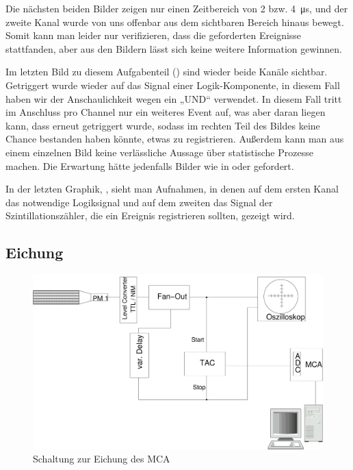 Die nächsten beiden Bilder zeigen nur einen Zeitbereich von 2 bzw.
\SI{4}{\micro\second}, und der zweite Kanal wurde von uns offenbar aus dem
sichtbaren Bereich hinaus bewegt. Somit kann man leider nur verifizieren, dass
die geforderten Ereignisse stattfanden, aber aus den Bildern lässt sich keine
weitere Information gewinnen. 

Im letzten Bild zu diesem Aufgabenteil () sind wieder beide
Kanäle sichtbar. Getriggert wurde wieder auf das Signal einer Logik-Komponente,
in diesem Fall haben wir der Anschaulichkeit wegen ein „UND“ verwendet. In
diesem Fall tritt im Anschluss pro Channel nur ein weiteres Event auf, was aber
daran liegen kann, dass erneut getriggert wurde, sodass im rechten Teil des
Bildes keine Chance bestanden haben könnte, etwas zu registrieren. Außerdem
kann man aus einem einzelnen Bild keine verlässliche Aussage über statistische
Prozesse machen. Die Erwartung hätte jedenfalls Bilder wie in
 oder  gefordert.

In der letzten Graphik, , sieht man Aufnahmen, in denen auf
dem ersten Kanal das notwendige Logiksignal und auf dem zweiten das Signal der
Szintillationszähler, die ein Ereignis registrieren sollten, gezeigt wird.

\subsection{Eichung}

\begin{figure}[ht!]
  \centering
  \includegraphics[width=\columnwidth,keepaspectratio=true]{zeit_schaltung}
  \caption{Schaltung zur Eichung des MCA}
  \label{fig:zeit_schaltung}
\end{figure}

